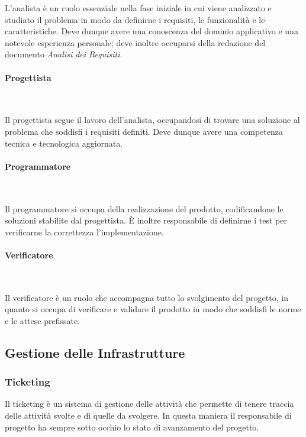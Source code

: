         \noindent L'analista è un ruolo essenziale nella fase iniziale in cui viene analizzato e studiato il problema in modo da definirne i requisiti, le funzionalità e le caratteristiche. Deve dunque avere una conoscenza del dominio applicativo e una notevole esperienza personale; deve inoltre occuparsi della redazione del documento \textit{Analisi dei Requisiti}.

        \paragraph{Progettista} ~

        \noindent Il progettista segue il lavoro dell'analista, occupandosi di trovare una soluzione al problema che soddisfi i requisiti definiti. Deve dunque avere una competenza tecnica e tecnologica aggiornata.

        \paragraph{Programmatore} ~

        \noindent Il programmatore si occupa della realizzazione del prodotto, codificandone le soluzioni stabilite dal progettista.
        È inoltre responsabile di definirne i test per verificarne la correttezza l'implementazione.

        \paragraph{Verificatore} ~

        \noindent Il verificatore è un ruolo che accompagna tutto lo svolgimento del progetto, in quanto si occupa di verificare e validare il prodotto in modo che soddisfi le norme e le attese prefissate.

    \subsection{Gestione delle Infrastrutture}
        \subsubsection{Ticketing} 
        Il ticketing è un sistema di gestione delle attività che permette di tenere traccia delle attività svolte e di quelle da svolgere. In questa maniera il responsabile di progetto ha sempre sotto occhio lo stato di avanzamento del progetto.

